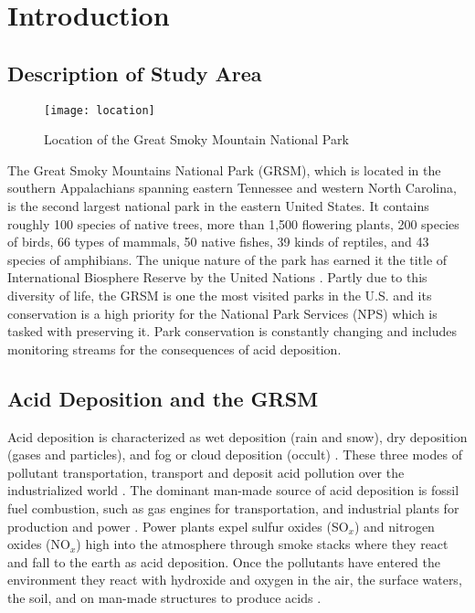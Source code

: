 \chapter{Introduction} \label{ch:intro}

\section{Description of Study Area}

\begin{figure}[h!]
  \centering
  \texttt{[image: location]}\\
  \caption{Location of the Great Smoky Mountain National Park}\label{fig:location}
\end{figure}

The Great Smoky Mountains National Park (GRSM), which is located in the southern Appalachians spanning eastern Tennessee and western North Carolina, is the second largest national park in the eastern United States.
It contains roughly 100 species of native trees, more than 1,500 flowering plants, 200 species of birds, 66 types of mammals, 50 native fishes, 39 kinds of reptiles, and 43 species of amphibians.
The unique nature of the park has earned it the title of  International Biosphere Reserve by the United Nations \citep{NPS}.    
Partly due to this diversity of life, the GRSM is one the most visited parks in the U.S. and its conservation is a high priority for the National Park Services (NPS) which is tasked with preserving it.        
Park conservation is constantly changing and  includes monitoring streams for the consequences of acid deposition.     
    
\section{Acid Deposition and the GRSM}

Acid deposition is characterized as wet deposition (rain and snow), dry deposition (gases and particles), and fog or cloud deposition (occult) \citep{lovett1994atmospheric}.
These three modes of pollutant transportation, transport and deposit acid pollution over the industrialized world \citep{board1983acid}.
The dominant man-made source of  acid deposition is fossil fuel combustion, such as gas engines for transportation, and industrial plants for production and power \citep{EPA2}.
Power plants expel sulfur oxides (SO$_x$) and nitrogen oxides (NO$_x$) high into the atmosphere through smoke stacks where they react and fall to the earth as acid deposition.
Once the pollutants have entered the environment they react with hydroxide and oxygen in the air, the surface waters, the soil, and on man-made structures to produce acids \citep{board1983acid}. 
 
